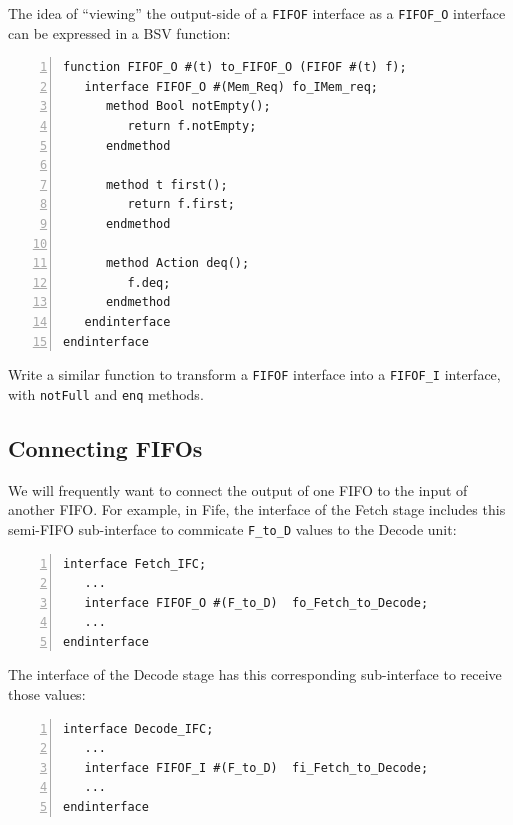 The idea of ``viewing'' the output-side of a \verb|FIFOF| interface as
a \verb|FIFOF_O| interface can be expressed in a BSV function:

{\small
\begin{Verbatim}[frame=single, numbers=left]
function FIFOF_O #(t) to_FIFOF_O (FIFOF #(t) f);
   interface FIFOF_O #(Mem_Req) fo_IMem_req;
      method Bool notEmpty();
         return f.notEmpty;
      endmethod

      method t first();
         return f.first;
      endmethod

      method Action deq();
         f.deq;
      endmethod
   endinterface
endinterface
\end{Verbatim}
}

\hdivider

\Exercise

Write a similar function to transform a \verb|FIFOF| interface into a
\verb|FIFOF_I| interface, with \verb|notFull| and \verb|enq| methods.

\Endexercise


\subsection{Connecting FIFOs}

\label{Sec_connecting_FIFOs}


We will frequently want to connect the output of one FIFO to the input
of another FIFO.  For example, in Fife, the interface of the Fetch
stage includes this semi-FIFO sub-interface to commicate \verb|F_to_D|
values to the Decode unit:

{\small
\begin{Verbatim}[frame=single, numbers=left]
interface Fetch_IFC;
   ...
   interface FIFOF_O #(F_to_D)  fo_Fetch_to_Decode;
   ...
endinterface
\end{Verbatim}
}

The interface of the Decode stage has this corresponding sub-interface
to receive those values:

{\small
\begin{Verbatim}[frame=single, numbers=left]
interface Decode_IFC;
   ...
   interface FIFOF_I #(F_to_D)  fi_Fetch_to_Decode;
   ...
endinterface
\end{Verbatim}
}


